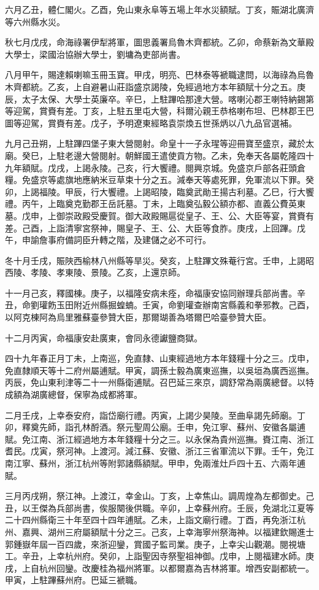 \begin{pinyinscope}
六月乙丑，體仁閣火。乙酉，免山東永阜等五場上年水災額賦。丁亥，賑湖北廣濟等六州縣水災。

秋七月戊戌，命海祿署伊犁將軍，圖思義署烏魯木齊都統。乙卯，命蔡新為文華殿大學士，梁國治協辦大學士，劉墉為吏部尚書。

八月甲午，賜達賴喇嘛玉冊玉寶。甲戌，明亮、巴林泰等褫職逮問，以海祿為烏魯木齊都統。乙亥，上自避暑山莊詣盛京謁陵，免經過地方本年額賦十分之五。庚辰，太子太保、大學士英廉卒。辛巳，上駐蹕哈那達大營。喀喇沁郡王喇特納錫第等迎駕，賞賚有差。丁亥，上駐五里屯大營，科爾沁親王恭格喇布坦、巴林郡王巴圖等迎駕，賞賚有差。戊子，予明遼東經略袁崇煥五世孫炳以八九品官選補。

九月己丑朔，上駐蹕四堡子東大營閱射。命皇十一子永瑆等迎冊寶至盛京，藏於太廟。癸巳，上駐老邊大營閱射。朝鮮國王遣使貢方物。乙未，免奉天各屬乾隆四十九年額賦。戊戌，上謁永陵。己亥，行大饗禮。閱興京城。免盛京戶部各莊頭倉糧。免盛京等處旗地應納米豆草束十分之五。減奉天等處死罪，免軍流以下罪。癸卯，上謁福陵。甲辰，行大饗禮。上謁昭陵，臨奠武勛王揚古利墓。乙巳，行大饗禮。丙午，上臨奠克勤郡王岳託墓。丁未，上臨奠弘毅公額亦都、直義公費英東墓。戊申，上御崇政殿受慶賀。御大政殿賜扈從皇子、王、公、大臣等宴，賞賚有差。己酉，上詣清寧宮祭神，賜皇子、王、公、大臣等食胙。庚戌，上回蹕。戊午，申諭詹事府備詞臣升轉之階，及建儲之必不可行。

冬十月壬戌，賑陜西榆林八州縣等旱災。癸亥，上駐蹕文殊菴行宮。壬申，上謁昭西陵、孝陵、孝東陵、景陵。乙亥，上還京師。

十一月己亥，釋國棟。庚子，以福隆安病未痊，命福康安協同辦理兵部尚書。辛丑，命劉瓘飭玉田附近州縣掘蝗蝻。壬寅，命劉瓘查辦南宮縣義和拳邪教。己酉，以阿克棟阿為烏里雅蘇臺參贊大臣，那爾瑚善為塔爾巴哈臺參贊大臣。

十二月丙寅，命福康安赴廣東，會同永德讞鹽商獄。

四十九年春正月丁未，上南巡，免直隸、山東經過地方本年錢糧十分之三。戊申，免直隸順天等十二府州屬逋賦。甲寅，調孫士毅為廣東巡撫，以吳垣為廣西巡撫。丙辰，免山東利津等二十一州縣衛逋賦。召巴延三來京，調舒常為兩廣總督。以特成額為湖廣總督，保寧為成都將軍。

二月壬戌，上幸泰安府，詣岱廟行禮。丙寅，上謁少昊陵。至曲阜謁先師廟。丁卯，釋奠先師，詣孔林酹酒。祭元聖周公廟。壬申，免江寧、蘇州、安徽各屬逋賦。免江南、浙江經過地方本年錢糧十分之三。以永保為貴州巡撫。賚江南、浙江耆民。戊寅，祭河神。上渡河。減江蘇、安徽、浙江三省軍流以下罪。壬午，免江南江寧、蘇州，浙江杭州等附郭諸縣額賦。甲申，免兩淮灶戶四十五、六兩年逋賦。

三月丙戌朔，祭江神。上渡江，幸金山。丁亥，上幸焦山。調周煌為左都御史。己丑，以王傑為兵部尚書，俟服闋後供職。辛卯，上幸蘇州府。壬辰，免湖北江夏等二十四州縣衛三十年至四十四年逋賦。乙未，上詣文廟行禮。丁酉，再免浙江杭州、嘉興、湖州三府屬額賦十分之三。己亥，上幸海寧州祭海神。以福建欽賜進士郭鍾嶽年屆一百四歲，來浙迎鑾，賞國子監司業。庚子，上幸尖山觀潮。閱視塘工。辛丑，上幸杭州府。癸卯，上詣聖因寺祭聖祖神御。戊申，上閱福建水師。庚戌，上自杭州回鑾。改慶桂為福州將軍。以都爾嘉為吉林將軍。增西安副都統一。甲寅，上駐蹕蘇州府。巴延三褫職。


\end{pinyinscope}
